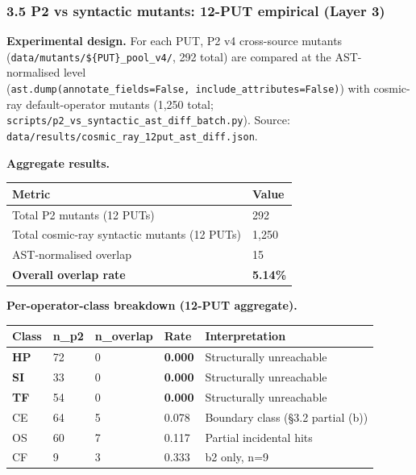 \documentclass[review,12pt,authoryear]{elsarticle}
\newcounter{none}                   %
\begin{document}
\subsubsection{3.5 P2 vs syntactic mutants: 12-PUT empirical (Layer
3)}\label{p2-vs-syntactic-mutants-12-put-empirical-layer-3}

\textbf{Experimental design.} For each PUT, P2 v4 cross-source mutants
(\texttt{data/mutants/\$\{PUT\}\_pool\_v4/}, 292 total) are compared at
the AST-normalised level
(\texttt{ast.dump(annotate\_fields=False,\ include\_attributes=False)})
with cosmic-ray default-operator mutants (1,250 total;
\texttt{scripts/p2\_vs\_syntactic\_ast\_diff\_batch.py}). Source:
\texttt{data/results/cosmic\_ray\_12put\_ast\_diff.json}.

\textbf{Aggregate results.}

{\def\LTcaptype{none} %
\begin{longtable}[]{@{}ll@{}}
\toprule\noalign{}
Metric & Value \\
\midrule\noalign{}
\endhead
\bottomrule\noalign{}
\endlastfoot
Total P2 mutants (12 PUTs) & 292 \\
Total cosmic-ray syntactic mutants (12 PUTs) & 1,250 \\
AST-normalised overlap & 15 \\
\textbf{Overall overlap rate} & \textbf{5.14\%} \\
\end{longtable}
}

\textbf{Per-operator-class breakdown (12-PUT aggregate).}

{\def\LTcaptype{none} %
\begin{longtable}[]{@{}lllll@{}}
\toprule\noalign{}
Class & n\_p2 & n\_overlap & Rate & Interpretation \\
\midrule\noalign{}
\endhead
\bottomrule\noalign{}
\endlastfoot
\textbf{HP} & 72 & 0 & \textbf{0.000} & Structurally unreachable \\
\textbf{SI} & 33 & 0 & \textbf{0.000} & Structurally unreachable \\
\textbf{TF} & 54 & 0 & \textbf{0.000} & Structurally unreachable \\
CE & 64 & 5 & 0.078 & Boundary class (§3.2 partial (b)) \\
OS & 60 & 7 & 0.117 & Partial incidental hits \\
CF & 9 & 3 & 0.333 & b2 only, n=9 \\
\end{longtable}
}
\end{document}
